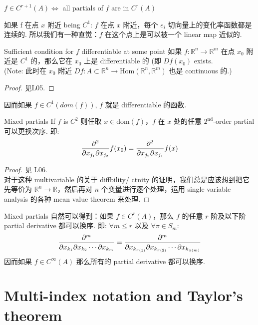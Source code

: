 \documentclass[lang=cn,11pt]{elegantbook}
\begin{document}
\begin{remark}
    $f \in C^{r+1}(A) \Leftrightarrow $ all partials of $f$ are in $C^r(A)$
\end{remark}



    如果 f 在点 $x$ 附近 being $C^1$: $f$ 在点 $x$ 附近，每个 $e_i$ 切向量上的变化率函数都是连续的. 所以我们有一种直觉：$f$ 在这个点上是可以被一个 linear map 近似的.

\begin{theorem}{Sufficient condition for $f$ differentiable at some point}
    如果 $f: \mathbb{R}^n \rightarrow \mathbb{R}^m$ 在点 $x_0$ 附近是 $C^1$ 的，那么它在 $x_0$ 上是 differentiable 的 (即 $Df(x_0)$ exists.\\
    (Note: 此时在 $x_0$ 附近 $Df: A \subset \mathbb{R}^n \rightarrow \text{Hom}(\mathbb{R}^n, \mathbb{R}^m) $ 也是 continuous 的.)
\end{theorem}
\begin{proof}
见L05.
\end{proof}

\begin{remark}
    因而如果 $f \in C^1(dom(f))$, $f$ 就是 differentiable 的函数.
\end{remark}


\begin{theorem}{Mixed partials}
    If $f$ is $C^2$ 则任取 $x \in \text{dom}(f)$，$f$ 在 $x$ 处的任意 $2^\text{nd}$-order partial 可以更换次序. 即:
    $$
    {\partial^2 \over \partial x_{j_1} \partial x_{j_2}}f(x_0) = {\partial^2 \over \partial x_{j_2} \partial x_{j_1}} f(x)
    $$
\end{theorem}
\begin{proof}
    见 L06.\\
    对于这种 multivariable 的关于 diffbility/ ctnity 的证明，我们总是应该想到把它先等价为 $\mathbb{R}^n \rightarrow \mathbb{R}$，然后再对 $n$ 个变量进行逐个处理，运用 single variable analysis 的各种 mean value theorem 来处理.
\end{proof}


\begin{corollary}{Mixed partials}\label{Mixed partials}
    自然可以得到：如果 $f \in C^r(A)$，那么 $f$ 的任意 $r$ 阶及以下阶 partial derivative 都可以换序. 即: $\forall m \leq r$ 以及 $\forall \pi \in S_m$:
    $$
     {\partial^m \over \partial x_{k_1}\partial x_{k_{2}}\cdots \partial x_{k_m}} = {\partial^m \over \partial x_{k_{\pi(1)}}\partial x_{k_{\pi(2)}}\cdots \partial x_{k_{\pi(m)}}}
    $$
    因而如果 $f\in C^\infty (A)$ 那么所有的 partial derivative 都可以换序.
\end{corollary}


\section{Multi-index notation and Taylor's theorem}
\end{document}
